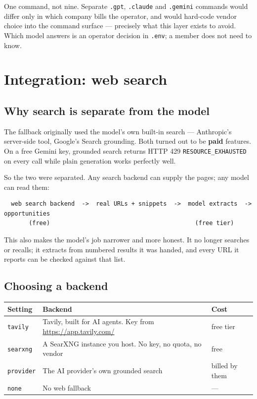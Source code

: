 \documentclass[11pt,a4paper]{report}
\newcommand{\dash}{---}
\begin{document}
One command, not nine. Separate \texttt{.gpt}, \texttt{.claude} and
\texttt{.gemini} commands would differ only in which company bills the
operator, and would hard-code vendor choice into the command surface \dash{}
precisely what this layer exists to avoid. Which model answers is an operator
decision in \texttt{.env}; a member does not need to know.

\chapter{Integration: web search}
\label{ch:websearch}

\section{Why search is separate from the model}

The fallback originally used the model's own built-in search \dash{}
Anthropic's server-side tool, Google's Search grounding. Both turned out to be
\textbf{paid} features. On a free Gemini key, grounded search returns HTTP 429
\texttt{RESOURCE\_EXHAUSTED} on every call while plain generation works
perfectly well.

So the two were separated. Any search backend can supply the pages; any model
can read them:

\begin{lstlisting}
  web search backend  ->  real URLs + snippets  ->  model extracts  ->  opportunities
       (free)                                         (free tier)
\end{lstlisting}

This also makes the model's job narrower and more honest. It no longer searches
or recalls; it extracts from numbered results it was handed, and every URL it
reports can be checked against that list.

\section{Choosing a backend}

\begin{center}
\begin{tabularx}{\textwidth}{@{}lXl@{}}
\toprule
\textbf{Setting} & \textbf{Backend} & \textbf{Cost} \\
\midrule
\texttt{tavily} & Tavily, built for AI agents. Key from
\url{https://app.tavily.com/} & free tier \\
\texttt{searxng} & A SearXNG instance you host. No key, no quota, no vendor &
free \\
\texttt{provider} & The AI provider's own grounded search & billed by them \\
\texttt{none} & No web fallback & \dash{} \\
\bottomrule
\end{tabularx}
\end{center}
\end{document}
